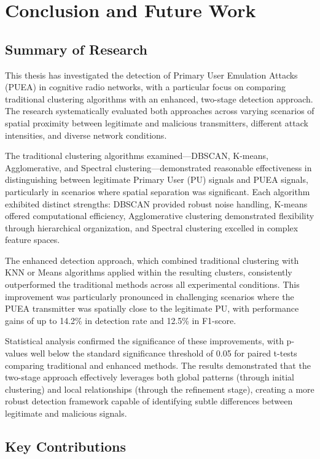 \chapter{Conclusion and Future Work}

\section{Summary of Research}

This thesis has investigated the detection of Primary User Emulation Attacks (PUEA) in cognitive radio networks, with a particular focus on comparing traditional clustering algorithms with an enhanced, two-stage detection approach. The research systematically evaluated both approaches across varying scenarios of spatial proximity between legitimate and malicious transmitters, different attack intensities, and diverse network conditions.

The traditional clustering algorithms examined—DBSCAN, K-means, Agglomerative, and Spectral clustering—demonstrated reasonable effectiveness in distinguishing between legitimate Primary User (PU) signals and PUEA signals, particularly in scenarios where spatial separation was significant. Each algorithm exhibited distinct strengths: DBSCAN provided robust noise handling, K-means offered computational efficiency, Agglomerative clustering demonstrated flexibility through hierarchical organization, and Spectral clustering excelled in complex feature spaces.

The enhanced detection approach, which combined traditional clustering with KNN or Means algorithms applied within the resulting clusters, consistently outperformed the traditional methods across all experimental conditions. This improvement was particularly pronounced in challenging scenarios where the PUEA transmitter was spatially close to the legitimate PU, with performance gains of up to 14.2\% in detection rate and 12.5\% in F1-score.

Statistical analysis confirmed the significance of these improvements, with p-values well below the standard significance threshold of 0.05 for paired t-tests comparing traditional and enhanced methods. The results demonstrated that the two-stage approach effectively leverages both global patterns (through initial clustering) and local relationships (through the refinement stage), creating a more robust detection framework capable of identifying subtle differences between legitimate and malicious signals.

\section{Key Contributions}


